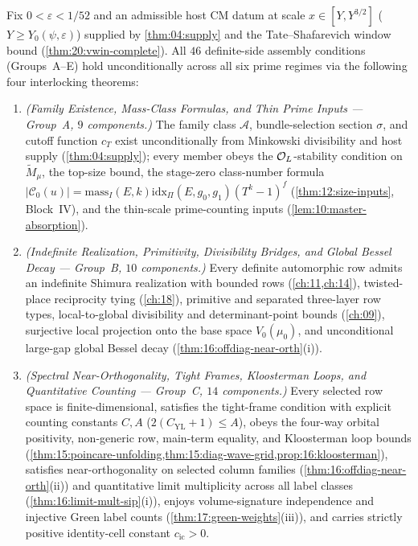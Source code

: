 \begin{theorem}
\label{thm:17:definite-assembly}
Fix $0 < \varepsilon < 1/52$ and an admissible host CM datum at scale $x \in [Y, Y^{3/2}]$ ($Y \ge Y_0(\psi, \varepsilon)$) supplied by \cref{thm:04:supply} and the Tate--Shafarevich window bound (\cref{thm:20:vwin-complete}). All $46$ definite-side assembly conditions (Groups~A--E) hold unconditionally across all six prime regimes via the following four interlocking theorems:
\begin{enumerate}[label=\textup{\textbf{Definite Theorem~\Roman*.}}]
\item \emph{(Family Existence, Mass-Class Formulas, and Thin Prime Inputs — Group~A, $9$ components.)}
  The family class $\mathcal{A}$, bundle-selection section $\sigma$, and cutoff function $c_T$ exist unconditionally from Minkowski divisibility and host supply (\cref{thm:04:supply}); every member obeys the $\mathcal{O}_L$-stability condition on $\widetilde{M}_\mu$, the top-size bound, the stage-zero class-number formula $|\mathcal{C}_0(u)| = \mathrm{mass}_I(E, k)\mathrm{idx}_\Pi(E, g_0, g_1)(T^k - 1)^f$ (\cref{thm:12:size-inputs}, Block~IV), and the thin-scale prime-counting inputs (\cref{lem:10:master-absorption}).

\item \emph{(Indefinite Realization, Primitivity, Divisibility Bridges, and Global Bessel Decay — Group~B, $10$ components.)}
  Every definite automorphic row admits an indefinite Shimura realization with bounded rows (\cref{ch:11,ch:14}), twisted-place reciprocity tying (\cref{ch:18}), primitive and separated three-layer row types, local-to-global divisibility and determinant-point bounds (\cref{ch:09}), surjective local projection onto the base space $V_0(\mu_0)$, and unconditional large-gap global Bessel decay (\cref{thm:16:offdiag-near-orth}(i)).

\item \emph{(Spectral Near-Orthogonality, Tight Frames, Kloosterman Loops, and Quantitative Counting — Group~C, $14$ components.)}
  Every selected row space is finite-dimensional, satisfies the tight-frame condition with explicit counting constants $C, A$ ($2(C_{\mathrm{YL}} + 1) \le A$), obeys the four-way orbital positivity, non-generic row, main-term equality, and Kloosterman loop bounds (\cref{thm:15:poincare-unfolding,thm:15:diag-wave-grid,prop:16:kloosterman}), satisfies near-orthogonality on selected column families (\cref{thm:16:offdiag-near-orth}(ii)) and quantitative limit multiplicity across all label classes (\cref{thm:16:limit-mult-sip}(i)), enjoys volume-signature independence and injective Green label counts (\cref{thm:17:green-weights}(iii)), and carries strictly positive identity-cell constant $c_{\mathrm{ic}} > 0$.


\end{enumerate}
\end{theorem}
